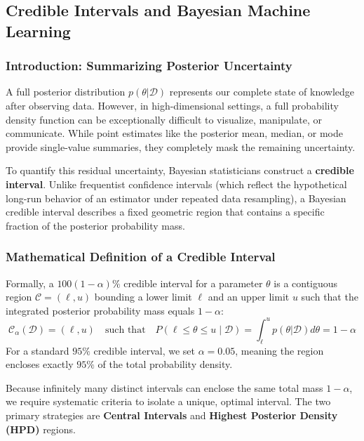 \documentclass{article}
\begin{document}
\subsection{Credible Intervals and Bayesian Machine Learning}

\subsubsection{Introduction: Summarizing Posterior Uncertainty}
A full posterior distribution $p(\theta|\mathcal{D})$ represents our complete state of knowledge after observing data. However, in high-dimensional settings, a full probability density function can be exceptionally difficult to visualize, manipulate, or communicate. While point estimates like the posterior mean, median, or mode provide single-value summaries, they completely mask the remaining uncertainty. 

To quantify this residual uncertainty, Bayesian statisticians construct a \textbf{credible interval}. Unlike frequentist confidence intervals (which reflect the hypothetical long-run behavior of an estimator under repeated data resampling), a Bayesian credible interval describes a fixed geometric region that contains a specific fraction of the posterior probability mass.

\subsubsection{Mathematical Definition of a Credible Interval}
Formally, a $100(1-\alpha)\%$ credible interval for a parameter $\theta$ is a contiguous region $\mathcal{C} = (\ell, u)$ bounding a lower limit $\ell$ and an upper limit $u$ such that the integrated posterior probability mass equals $1 - \alpha$:
\begin{equation}
\mathcal{C}_{\alpha}(\mathcal{D}) = (\ell, u) \quad \text{such that} \quad P(\ell \le \theta \le u \mid \mathcal{D}) = \int_{\ell}^{u} p(\theta|\mathcal{D}) d\theta = 1 - \alpha
\end{equation}
For a standard $95\%$ credible interval, we set $\alpha = 0.05$, meaning the region encloses exactly $95\%$ of the total probability density.

Because infinitely many distinct intervals can enclose the same total mass $1-\alpha$, we require systematic criteria to isolate a unique, optimal interval. The two primary strategies are \textbf{Central Intervals} and \textbf{Highest Posterior Density (HPD)} regions.
\end{document}
